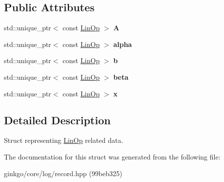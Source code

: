 \subsection*{Public Attributes}
\begin{DoxyCompactItemize}
\item 
\mbox{\label{structgko_1_1log_1_1linop__data_a02a1a3dacdf707cc5b6ee1173aad7aad}} 
std\+::unique\+\_\+ptr$<$ const \hyperlink{classgko_1_1LinOp}{Lin\+Op} $>$ {\bfseries A}
\item 
\mbox{\label{structgko_1_1log_1_1linop__data_ac65bf9ffa7f7d14a86b21d073d21471e}} 
std\+::unique\+\_\+ptr$<$ const \hyperlink{classgko_1_1LinOp}{Lin\+Op} $>$ {\bfseries alpha}
\item 
\mbox{\label{structgko_1_1log_1_1linop__data_aa03f552586f8de9e953057762d6e0b4b}} 
std\+::unique\+\_\+ptr$<$ const \hyperlink{classgko_1_1LinOp}{Lin\+Op} $>$ {\bfseries b}
\item 
\mbox{\label{structgko_1_1log_1_1linop__data_a5c0014fd2c39f067bbcc32e79b458b7b}} 
std\+::unique\+\_\+ptr$<$ const \hyperlink{classgko_1_1LinOp}{Lin\+Op} $>$ {\bfseries beta}
\item 
\mbox{\label{structgko_1_1log_1_1linop__data_a9c7297540351403305fc1633dad9fea6}} 
std\+::unique\+\_\+ptr$<$ const \hyperlink{classgko_1_1LinOp}{Lin\+Op} $>$ {\bfseries x}
\end{DoxyCompactItemize}


\subsection{Detailed Description}
Struct representing \hyperlink{classgko_1_1LinOp}{Lin\+Op} related data. 

The documentation for this struct was generated from the following file\+:\begin{DoxyCompactItemize}
\item 
ginkgo/core/log/record.\+hpp (99beb325)\end{DoxyCompactItemize}
